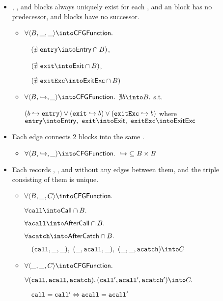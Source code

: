 \begin{itemize}
\item \Entry, \Exit, and \ExitExc blocks always uniquely exist for each \CFGFunction,
and an \Entry block has no predecessor, \Exit and \ExitExc blocks have no successor.
\begin{itemize}
\item $\forall \langle B, \_, \_ \rangle \into \CFGFunction.$

$\quad(\nexists\ \entry \into\Entry\cap B)$,

$\quad(\nexists\ \exit \into \Exit \cap B)$,

$\quad(\nexists\ \exitExc \into \ExitExc \cap B)$
\item $\forall \langle B, \hookrightarrow, \_ \rangle \into \CFGFunction.$
$\nexists b \into B.$ s.t.

$(b \hookrightarrow \mbox{\texttt{entry}}) \vee (\mbox{\texttt{exit}} \hookrightarrow b) \vee (\mbox{\texttt{exitExc}} \hookrightarrow b)$
where $\entry \into \Entry,\ \exit \into \Exit,\ \exitExc \into \ExitExc$
\end{itemize}

\item Each edge connects 2 blocks into the same \CFGFunction.
\begin{itemize}
\item $\forall \langle B, \hookrightarrow, \_ \rangle \into \CFGFunction.\ \hookrightarrow\ \subseteq B \times B$
\end{itemize}

\item Each \CFGFunction records \Call, \AfterCall, and \AfterCatch
without any edges between them, and the triple consisting of them is unique.
\begin{itemize}
\item $\forall \langle B, \_, C \rangle \into \CFGFunction.$

$\forall \call \into \Call \cap B.\ $

$\forall \acall \into \AfterCall \cap B.\ $

$\forall \acatch \into \AfterCatch \cap B.\ $

$\quad(\call, \_, \_),\ (\_, \acall, \_),\ (\_, \_, \acatch) \into C$
\item $\forall \langle \_, \_, C \rangle \into \CFGFunction.$

\mbox{$\forall (\call, \acall, \acatch), (\call', \acall', \acatch') \into C.$}

$\quad\mbox{\texttt{call}} = \mbox{\texttt{call}}' \Leftrightarrow \mbox{\texttt{acall}} = \mbox{\texttt{acall}}'$


\end{itemize}
\end{itemize}
